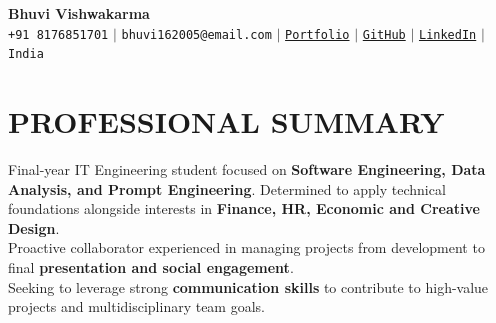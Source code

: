 \documentclass[letterpaper,11pt]{article}
\begin{document}
\begin{center}
    \textbf{\Huge Bhuvi Vishwakarma} \\ \vspace{5pt}
    \small 
    \faPhone* \texttt{+91 8176851701} \hspace{1pt} $|$
    \hspace{1pt} \faEnvelope \hspace{2pt} \texttt{bhuvi162005@email.com} \hspace{1pt} $|$ 
    \hspace{1pt} \faGlobe \hspace{2pt} \href{https://about-bhuvi.netlify.app}{\texttt{Portfolio}} \hspace{1pt} $|$ 
    \hspace{1pt} \faGithub \hspace{2pt} \href{https://github.com/16bhuvi}{\texttt{GitHub}} \hspace{1pt} $|$
    \hspace{1pt} \faLinkedin \hspace{2pt} \href{https://linkedin.com/in/bhuvi-vishwakarma}{\texttt{LinkedIn}} \hspace{1pt} $|$
    \hspace{1pt} \faMapMarker* \hspace{2pt}\texttt{India}
    \\ \vspace{-3pt}
\end{center}

\section{PROFESSIONAL SUMMARY}
 \begin{itemize}[leftmargin=0in, label={}]
    \small{\item{
     {Final-year IT Engineering student focused on \textbf{Software Engineering, Data Analysis, and Prompt Engineering}. Determined to apply technical foundations alongside interests in \textbf{Finance, HR, Economic and Creative Design}.} \vspace{2pt} \\
     {Proactive collaborator experienced in managing projects from development to final \textbf{presentation and social engagement}.} \vspace{2pt} \\
     {Seeking to leverage strong \textbf{communication skills} to contribute to high-value projects and multidisciplinary team goals.}
    }}
 \end{itemize}
\end{document}
